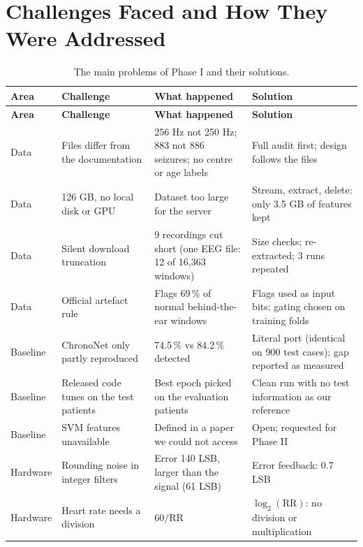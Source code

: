 \chapter{Challenges Faced and How They Were Addressed}\label{ch:challenges}

\begin{xltabular}{\textwidth}{@{}P{17mm}P{40mm}LL@{}}
\caption{The main problems of Phase I and their solutions.}\label{tab:challenges}\\
\toprule
\textbf{Area} & \textbf{Challenge} & \textbf{What happened} & \textbf{Solution}\\
\midrule
\endfirsthead
\toprule
\textbf{Area} & \textbf{Challenge} & \textbf{What happened} & \textbf{Solution}\\
\midrule
\endhead
\bottomrule
\endlastfoot
\small Data & \small Files differ from the documentation & \small 256 Hz not 250 Hz; 883 not 886 seizures; no centre
or age labels & \small Full audit first; design follows the files\\
\small Data & \small 126 GB, no local disk or GPU & \small Dataset too large for the server & \small Stream, extract,
delete: only 3.5 GB of features kept\\
\small Data & \small Silent download truncation & \small 9 recordings cut short (one EEG file: 12 of 16,363 windows) &
\small Size checks; re-extracted; 3 runs repeated\\
\small Data & \small Official artefact rule & \small Flags 69\,\% of normal behind-the-ear windows & \small Flags used
as input bits; gating chosen on training folds\\
\small Baseline & \small ChronoNet only partly reproduced & \small 74.5\,\% vs 84.2\,\% detected & \small Literal port
(identical on 900 test cases); gap reported as measured\\
\small Baseline & \small Released code tunes on the test patients & \small Best epoch picked on the evaluation
patients & \small Clean run with no test information as our reference\\
\small Baseline & \small SVM features unavailable & \small Defined in a paper we could not access & \small Open;
requested for Phase II\\
\small Hardware & \small Rounding noise in integer filters & \small Error 140 LSB, larger than the signal (61 LSB) &
\small Error feedback: 0.7 LSB\\
\small Hardware & \small Heart rate needs a division & \small $60/\mathrm{RR}$ & \small $\log_2(\mathrm{RR})$: no
division or multiplication\\

\end{xltabular}

